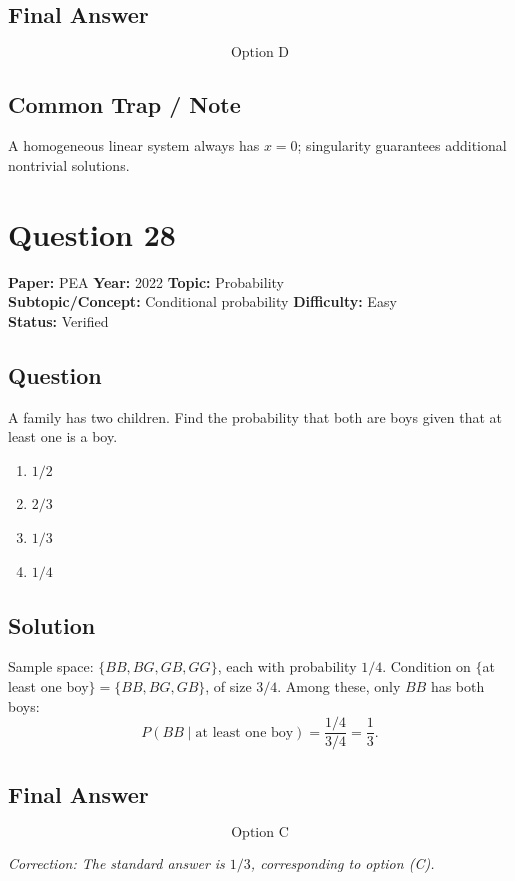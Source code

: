\documentclass[11pt]{article}
\begin{document}
\subsection*{Final Answer}
\[
\boxed{\text{Option D}}
\]

\subsection*{Common Trap / Note}
A homogeneous linear system always has $x = 0$; singularity guarantees additional nontrivial
solutions.

\section*{Question 28}
\textbf{Paper:} PEA \quad \textbf{Year:} 2022 \quad \textbf{Topic:} Probability \\
\textbf{Subtopic/Concept:} Conditional probability \quad \textbf{Difficulty:} Easy \\
\textbf{Status:} Verified

\subsection*{Question}
A family has two children. Find the probability that both are boys given that at least one
is a boy.
\begin{enumerate}[label=(\Alph*)]
\item $1/2$
\item $2/3$
\item $1/3$
\item $1/4$
\end{enumerate}

\subsection*{Solution}
Sample space: $\{BB, BG, GB, GG\}$, each with probability $1/4$. Condition on $\{$at least one
boy$\} = \{BB, BG, GB\}$, of size $3/4$. Among these, only $BB$ has both boys:
\[
P(BB \mid \text{at least one boy}) = \frac{1/4}{3/4} = \frac{1}{3}.
\]

\subsection*{Final Answer}
\[
\boxed{\text{Option C}}
\]

\textit{Correction: The standard answer is $1/3$, corresponding to option (C).}
\end{document}
